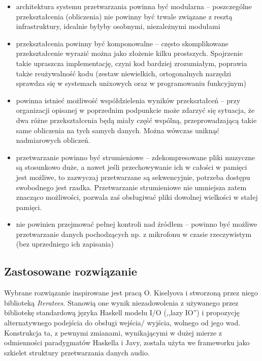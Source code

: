 \begin{itemize}

  \item architektura systemu przetwarzania powinna być modularna -- poszczególne przekształcenia
    (obliczenia) nie powinny być trwale związane z resztą infrastruktury, idealnie byłyby osobnymi,
    niezależnymi modułami

  \item przekształcenia powinny być komponowalne -- często skomplikowane przekształcenie wyrazić
    można jako złożenie kilku prostszych. Spojrzenie takie upraszcza implementację, czyni kod
    bardziej zrozumiałym, poprawia także reużywalność kodu (zestaw niewielkich, ortogonalnych
    narzędzi sprawdza się w systemach unixowych oraz w programowaniu funkcyjnym)

  \item powinna istnieć możliwość współdzielenia wyników przekształceń -- przy organizacji opisanej
    w poprzednim podpunkcie może zdarzyć się sytuacja, że dwa różne przekształcenia będą miały część
    wspólną, przeprowadzającą takie same obliczenia na tych samych danych. Można wówczas uniknąć
    nadmiarowych obliczeń.

  \item przetwarzanie powinno być strumieniowe -- zdekompresowane pliki muzyczne są stosunkowo duże,
    a nawet jeśli przechowywanie ich w całości w pamięci jest możliwe, to zazwyczaj przetwarzane są
    sekwencyjnie, potrzeba dostępu swobodnego jest rzadka. Przetwarzanie strumieniowe nie umniejsza
    zatem znacząco możliwości, pozwala zaś obsługiwać pliki dowolnej wielkości w stałej pamięci.

  \item nie powinien przejmować pełnej kontroli nad źródłem -- powinno być możliwe przetwarzanie
    danych pochodzących np. z mikrofonu w czasie rzeczywistym (bez uprzedniego ich zapisania)

\end{itemize}


\subsection{Zastosowane rozwiązanie}

Wybrane rozwiązanie inspirowane jest pracą O. Kiselyova i stworzoną przez niego biblioteką
\emph{Iteratees}. Stanowią one wynik niezadowolenia z używanego przez bibliotekę standardową języka
Haskell modelu I/O (,,lazy IO'') i propozycję alternatywnego podejścia do obsługi wejścia\slash
wyjścia, wolnego od jego wad. Konstrukcja ta, z pewnymi zmianami, wynikającymi w dużej mierze z
odmienności paradygmatów Haskella i Javy, została użyta we frameworku jako szkielet struktury
przetwarzania danych audio.


